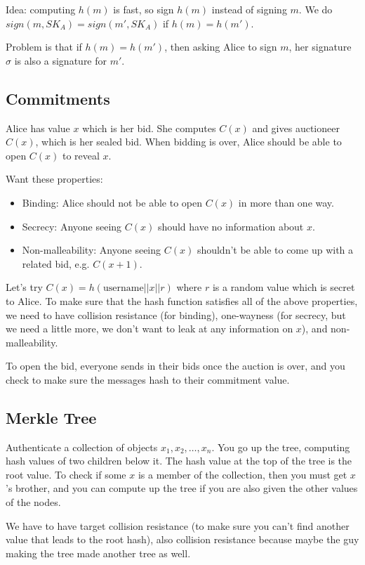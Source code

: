 \documentclass[psamsfonts]{amsart}
\begin{document}
Idea: computing $h(m)$ is fast, so sign $h(m)$ instead of signing $m$. We do $sign(m, SK_A) = sign(m', SK_A)$ if $h(m) = h(m')$.

Problem is that if $h(m) = h(m')$, then asking Alice to sign $m$, her signature $\sigma$ is also a signature for $m'$.

\subsection{Commitments}

Alice has value $x$ which is her bid. She computes $C(x)$ and gives auctioneer $C(x)$, which is her sealed bid. When bidding is over, Alice should be able to open $C(x)$ to reveal $x$.

Want these properties:
\begin{itemize}
  \item Binding: Alice should not be able to open $C(x)$ in more than one way.
  \item Secrecy: Anyone seeing $C(x)$ should have no information about $x$.
  \item Non-malleability: Anyone seeing $C(x)$ shouldn't be able to come up with a related bid, e.g. $C(x+1)$.
\end{itemize}

Let's try $C(x) = h(\textrm{username} || x || r)$ where $r$ is a random value which is secret to Alice. To make sure that the hash function satisfies all of the above properties, we need to have collision resistance (for binding), one-wayness (for secrecy, but we need a little more, we don't want to leak at any information on $x$), and non-malleability.

To open the bid, everyone sends in their bids once the auction is over, and you check to make sure the messages hash to their commitment value.

\subsection{Merkle Tree}

Authenticate a collection of objects $x_1, x_2, \ldots, x_n$. You go up the tree, computing hash values of two children below it. The hash value at the top of the tree is the root value. To check if some $x$ is a member of the collection, then you must get $x$'s brother, and you can compute up the tree if you are also given the other values of the nodes.

We have to have target collision resistance (to make sure you can't find another value that leads to the root hash), also collision resistance because maybe the guy making the tree made another tree as well.
\end{document}
